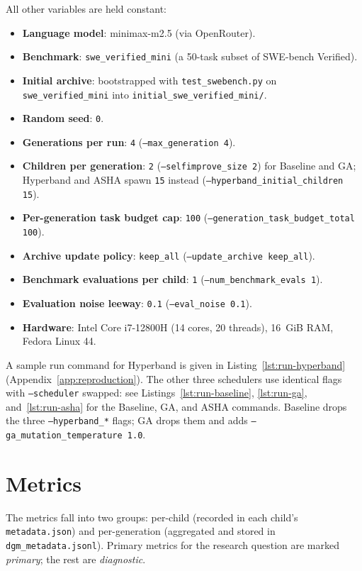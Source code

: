All other variables are held constant:
\begin{itemize}
  \item \textbf{Language model}: minimax-m2.5 (via OpenRouter).
  \item \textbf{Benchmark}: \texttt{swe\_verified\_mini} (a 50-task
    subset of SWE-bench Verified).
  \item \textbf{Initial archive}: bootstrapped with
    \texttt{test\bk\_swebench.py} on
    \texttt{swe\bk\_verified\bk\_mini} into
    \texttt{initial\bk\_swe\bk\_verified\bk\_mini/}.
  \item \textbf{Random seed}: \texttt{0}.
  \item \textbf{Generations per run}: \texttt{4}
    (\texttt{--max\_generation 4}).
  \item \textbf{Children per generation}: \texttt{2}
    (\texttt{--selfimprove\bk\_size 2}) for Baseline and GA;
    Hyperband and ASHA spawn \texttt{15} instead
    (\texttt{--hyperband\bk\_initial\bk\_children 15}).
  \item \textbf{Per-generation task budget cap}: \texttt{100}
    (\texttt{--generation\bk\_task\bk\_budget\bk\_total 100}).
  \item \textbf{Archive update policy}: \texttt{keep\_all}
    (\texttt{--update\bk\_archive keep\bk\_all}).
  \item \textbf{Benchmark evaluations per child}: \texttt{1}
    (\texttt{--num\_benchmark\_evals 1}).
  \item \textbf{Evaluation noise leeway}: \texttt{0.1}
    (\texttt{--eval\_noise 0.1}).
  \item \textbf{Hardware}: Intel Core i7-12800H (14 cores, 20 threads),
    16~GiB RAM, Fedora Linux 44.
\end{itemize}

A sample run command for Hyperband is given in
Listing~\ref{lst:run-hyperband} (Appendix~\ref{app:reproduction}). The
other three schedulers use identical flags with \texttt{--scheduler}
swapped: see Listings~\ref{lst:run-baseline}, \ref{lst:run-ga},
and~\ref{lst:run-asha} for the Baseline, GA, and ASHA commands. Baseline
drops the three \texttt{--hyperband\_*} flags; GA drops them and adds
\texttt{--ga\_mutation\_temperature 1.0}.

\section{Metrics}
\label{sec:metrics}

The metrics fall into two groups: per-child (recorded in each child's
\texttt{metadata.json}) and per-generation (aggregated and stored in
\texttt{dgm\bk\_metadata.jsonl}). Primary metrics for the research
question are marked \emph{primary}; the rest are \emph{diagnostic}.


